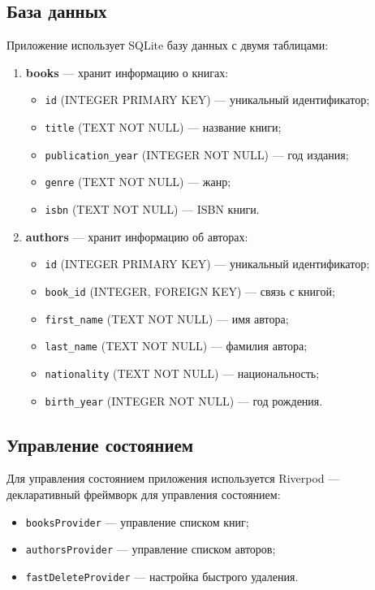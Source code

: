 \documentclass[oneside,a4paper,14pt]{extarticle}
\begin{document}
\subsection*{База данных}

Приложение использует SQLite базу данных с двумя таблицами:

\begin{enumerate}
	\item \textbf{books} — хранит информацию о книгах:
	\begin{itemize}
		\item \texttt{id} (INTEGER PRIMARY KEY) — уникальный идентификатор;
		\item \texttt{title} (TEXT NOT NULL) — название книги;
		\item \texttt{publication\_year} (INTEGER NOT NULL) — год издания;
		\item \texttt{genre} (TEXT NOT NULL) — жанр;
		\item \texttt{isbn} (TEXT NOT NULL) — ISBN книги.
	\end{itemize}

	\item \textbf{authors} — хранит информацию об авторах:
	\begin{itemize}
		\item \texttt{id} (INTEGER PRIMARY KEY) — уникальный идентификатор;
		\item \texttt{book\_id} (INTEGER, FOREIGN KEY) — связь с книгой;
		\item \texttt{first\_name} (TEXT NOT NULL) — имя автора;
		\item \texttt{last\_name} (TEXT NOT NULL) — фамилия автора;
		\item \texttt{nationality} (TEXT NOT NULL) — национальность;
		\item \texttt{birth\_year} (INTEGER NOT NULL) — год рождения.
	\end{itemize}
\end{enumerate}

\subsection*{Управление состоянием}

Для управления состоянием приложения используется Riverpod — декларативный фреймворк для управления состоянием:

\begin{itemize}
	\item[$-$] \texttt{booksProvider} — управление списком книг;
	\item[$-$] \texttt{authorsProvider} — управление списком авторов;
	\item[$-$] \texttt{fastDeleteProvider} — настройка быстрого удаления.
\end{itemize}
\end{document}
